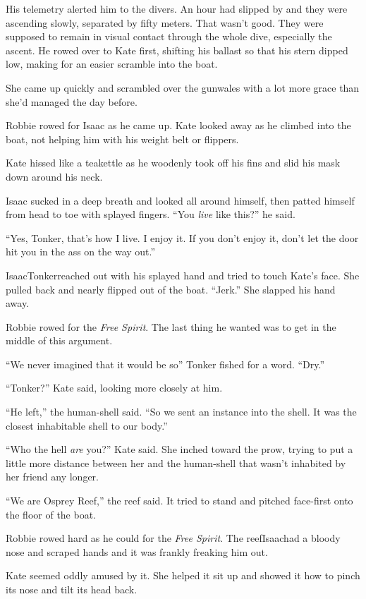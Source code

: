His telemetry alerted him to the divers. An hour had slipped by and
they were ascending slowly, separated by fifty meters. That wasn’t
good. They were supposed to remain in visual contact through the
whole dive, especially the ascent. He rowed over to Kate first,
shifting his ballast so that his stern dipped low, making for an
easier scramble into the boat.

She came up quickly and scrambled over the gunwales with a lot more
grace than she’d managed the day before.

Robbie rowed for Isaac as he came up. Kate looked away as he
climbed into the boat, not helping him with his weight belt or
flippers.

Kate hissed like a teakettle as he woodenly took off his fins and
slid his mask down around his neck.

Isaac sucked in a deep breath and looked all around himself, then
patted himself from head to toe with splayed fingers. “You
\emph{live} like this?” he said.

“Yes, Tonker, that’s how I live. I enjoy it. If you don’t enjoy it,
don’t let the door hit you in the ass on the way out.”

Isaac\dash{}Tonker\dash{}reached out with his splayed hand and tried to touch
Kate’s face. She pulled back and nearly flipped out of the boat.
“Jerk.” She slapped his hand away.

Robbie rowed for the \emph{Free Spirit}. The last thing he wanted
was to get in the middle of this argument.

“We never imagined that it would be so\dash{}” Tonker fished for a word.
“Dry.”

“Tonker?” Kate said, looking more closely at him.

“He left,” the human-shell said. “So we sent an instance into the
shell. It was the closest inhabitable shell to our body.”

“Who the hell \emph{are} you?” Kate said. She inched toward the
prow, trying to put a little more distance between her and the
human-shell that wasn’t inhabited by her friend any longer.

“We are Osprey Reef,” the reef said. It tried to stand and pitched
face-first onto the floor of the boat.

\tb

Robbie rowed hard as he could for the \emph{Free Spirit}. The
reef\dash{}Isaac\dash{}had a bloody nose and scraped hands and it was frankly
freaking him out.

Kate seemed oddly amused by it. She helped it sit up and showed it
how to pinch its nose and tilt its head back.

